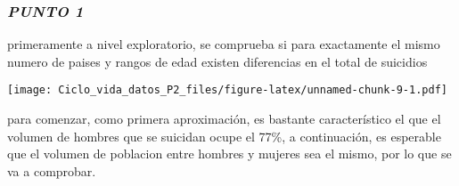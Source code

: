 \documentclass[]{article}
\newenvironment{Shaded}{\begin{snugshade}}{\end{snugshade}}
\newcommand{\KeywordTok}[1]{\textcolor[rgb]{0.13,0.29,0.53}{\textbf{#1}}}
\newcommand{\DataTypeTok}[1]{\textcolor[rgb]{0.13,0.29,0.53}{#1}}
\newcommand{\DecValTok}[1]{\textcolor[rgb]{0.00,0.00,0.81}{#1}}
\newcommand{\StringTok}[1]{\textcolor[rgb]{0.31,0.60,0.02}{#1}}
\newcommand{\CommentTok}[1]{\textcolor[rgb]{0.56,0.35,0.01}{\textit{#1}}}
\newcommand{\OperatorTok}[1]{\textcolor[rgb]{0.81,0.36,0.00}{\textbf{#1}}}
\newcommand{\NormalTok}[1]{#1}
\begin{document}
\subsubsection{\texorpdfstring{\textbf{\emph{PUNTO
1}}}{PUNTO 1}}\label{punto-1}

primeramente a nivel exploratorio, se comprueba si para exactamente el
mismo numero de paises y rangos de edad existen diferencias en el total
de suicidios

\begin{Shaded}
\end{Shaded}

\texttt{[image: Ciclo\_vida\_datos\_P2\_files/figure-latex/unnamed-chunk-9-1.pdf]}

para comenzar, como primera aproximación, es bastante característico el
que el volumen de hombres que se suicidan ocupe el 77\%, a continuación,
es esperable que el volumen de poblacion entre hombres y mujeres sea el
mismo, por lo que se va a comprobar.
\end{document}
